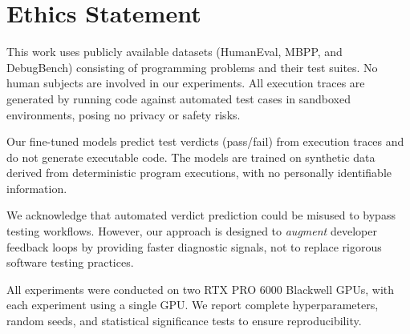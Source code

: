 \section*{Ethics Statement}

This work uses publicly available datasets (HumanEval, MBPP, and DebugBench) consisting of programming problems and their test suites. No human subjects are involved in our experiments. All execution traces are generated by running code against automated test cases in sandboxed environments, posing no privacy or safety risks.

Our fine-tuned models predict test verdicts (pass/fail) from execution traces and do not generate executable code. The models are trained on synthetic data derived from deterministic program executions, with no personally identifiable information.

We acknowledge that automated verdict prediction could be misused to bypass testing workflows. However, our approach is designed to \emph{augment} developer feedback loops by providing faster diagnostic signals, not to replace rigorous software testing practices.

All experiments were conducted on two RTX PRO 6000 Blackwell GPUs, with each experiment using a single GPU. We report complete hyperparameters, random seeds, and statistical significance tests to ensure reproducibility.
